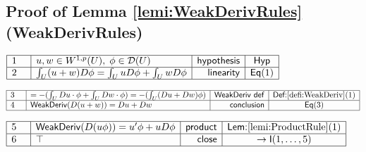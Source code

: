 \documentclass[11pt,reqno]{amsart}
\begin{document}
	\subsection*{Proof of Lemma \protect\ref{lemi:WeakDerivRules} (\textsf{WeakDerivRules})}
	\noindent$\begin{array}{|m{0.5cm}|l|r|c|}
	\hline
	1 & u,w\in W^{1,p}(U),\;\phi\in\mathcal{D}(U) & \mathsf{hypothesis} & \mathsf{Hyp} \\ \hline
	2 & \int_{U}(u+w)D\phi=\int_{U}uD\phi+\int_{U}wD\phi & \mathsf{linearity} & \mathsf{Eq}(1) \\ \hline
	\end{array}$
	\par\nointerlineskip\noindent$\begin{array}{|m{0.5cm}|l|r|c|}
	\hline
	3 & =-(\int_{U}Du\cdot\phi+\int_{U}Dw\cdot\phi)=-(\int_{U}(Du+Dw)\phi) & \mathsf{WeakDeriv\ def} & \textsf{Def:}\ref{defi:WeakDeriv}(1) \\ \hline
	4 & \mathsf{WeakDeriv}(D(u+w))=Du+Dw & \mathsf{conclusion} & \mathsf{Eq}(3) \\ \hline
	\end{array}$
	\par\nointerlineskip\noindent$\begin{array}{|m{0.5cm}|l|r|c|}
	\hline
	5 & \mathsf{WeakDeriv}(D(u\phi))=u^{\prime}\phi+uD\phi & \mathsf{product} & \textsf{Lem:}\ref{lemi:ProductRule}(1) \\ \hline
	6 & \top & \mathsf{close} & \to\mathsf{I}(1,\dots,5) \\ \hline
	\end{array}$
	\medskip
	
\end{document}
